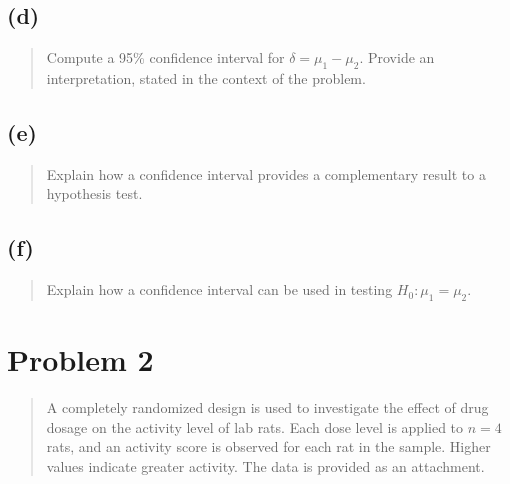 \documentclass[
]{article}
\begin{document}
\vspace{50pt}

\hypertarget{d}{%
\subsection{(d)}\label{d}}

\begin{quote}
Compute a 95\% confidence interval for \(\delta = \mu_1 - \mu_2\).
Provide an interpretation, stated in the context of the problem.
\end{quote}

\vspace{50pt}

\hypertarget{e}{%
\subsection{(e)}\label{e}}

\begin{quote}
Explain how a confidence interval provides a complementary result to a
hypothesis test.
\end{quote}

\vspace{50pt}

\hypertarget{f}{%
\subsection{(f)}\label{f}}

\begin{quote}
Explain how a confidence interval can be used in testing
\(H_0 : \mu_1 = \mu_2\).
\end{quote}

\vspace{50pt}

\hypertarget{problem-2}{%
\section{Problem 2}\label{problem-2}}

\begin{quote}
A completely randomized design is used to investigate the effect of drug
dosage on the activity level of lab rats. Each dose level is applied to
\(n=4\) rats, and an activity score is observed for each rat in the
sample. Higher values indicate greater activity. The data is provided as
an attachment.
\end{quote}

\vspace{50pt}
\end{document}
